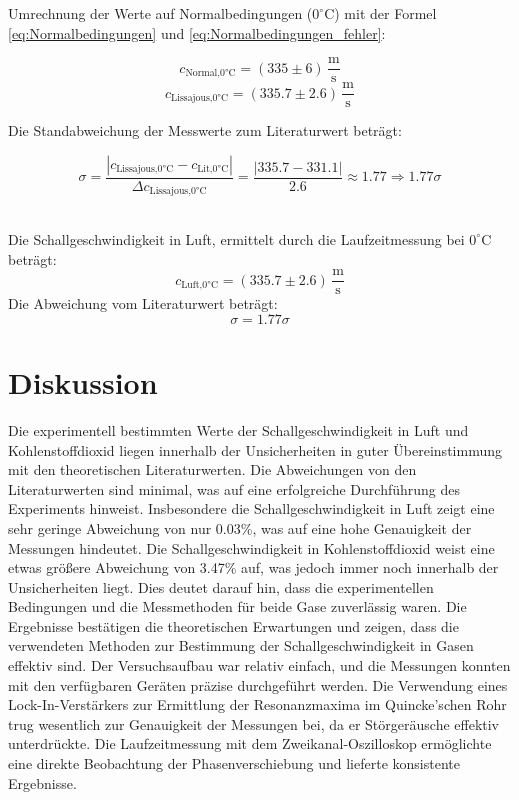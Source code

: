 \documentclass[12pt,a4paper,titlepage]{scrartcl}
\numberwithin{equation}{section}
\numberwithin{table}{section}
\numberwithin{figure}{section}
\begin{document}
Umrechnung der Werte auf Normalbedingungen ($0^{\circ}\text{C}$) mit der Formel \ref{eq:Normalbedingungen} und \ref{eq:Normalbedingungen_fehler}:

\begin{equation}
    c_\text{Normal,0°C} = (335\pm 6)\,\frac{\text{m}}{\text{s}}
\end{equation}
\begin{equation}
    c_\text{Lissajous,0°C} = (335.7\pm 2.6)\,\frac{\text{m}}{\text{s}}
\end{equation}

Die Standabweichung der Messwerte zum Literaturwert beträgt:

\begin{equation}
    \sigma = \frac{|c_\text{Lissajous,0°C} - c_\text{Lit,0°C}|}{\Delta c_\text{Lissajous,0°C}} = \frac{|335.7 - 331.1|}{2.6} \approx 1.77 \Rightarrow 1.77\sigma
\end{equation}
\

\begin{resultbox}
    Die Schallgeschwindigkeit in Luft, ermittelt durch die Laufzeitmessung bei $0^{\circ}\text{C}$ beträgt:
    \begin{equation}
        c_\text{Luft,0°C} = (335.7\pm 2.6)\,\frac{\text{m}}{\text{s}}
    \end{equation}
    Die Abweichung vom Literaturwert beträgt:
    \begin{equation}
        \sigma = 1.77\sigma
    \end{equation}
\end{resultbox}



\section{Diskussion}

Die experimentell bestimmten Werte der Schallgeschwindigkeit in Luft und Kohlenstoffdioxid liegen innerhalb der Unsicherheiten in guter Übereinstimmung mit den theoretischen Literaturwerten. Die Abweichungen von den Literaturwerten sind minimal, was auf eine erfolgreiche Durchführung des Experiments hinweist. Insbesondere die Schallgeschwindigkeit in Luft zeigt eine sehr geringe Abweichung von nur 0.03\%, was auf eine hohe Genauigkeit der Messungen hindeutet.
Die Schallgeschwindigkeit in Kohlenstoffdioxid weist eine etwas größere Abweichung von 3.47\% auf, was jedoch immer noch innerhalb der Unsicherheiten liegt. Dies deutet darauf hin, dass die experimentellen Bedingungen und die Messmethoden für beide Gase zuverlässig waren. Die Ergebnisse bestätigen die theoretischen Erwartungen und zeigen, dass die verwendeten Methoden zur Bestimmung der Schallgeschwindigkeit in Gasen effektiv sind.
Der Versuchsaufbau war relativ einfach, und die Messungen konnten mit den verfügbaren Geräten präzise durchgeführt werden. Die Verwendung eines Lock-In-Verstärkers zur Ermittlung der Resonanzmaxima im Quincke'schen Rohr trug wesentlich zur Genauigkeit der Messungen bei, da er Störgeräusche effektiv unterdrückte. Die Laufzeitmessung mit dem Zweikanal-Oszilloskop ermöglichte eine direkte Beobachtung der Phasenverschiebung und lieferte konsistente Ergebnisse.
\end{document}
